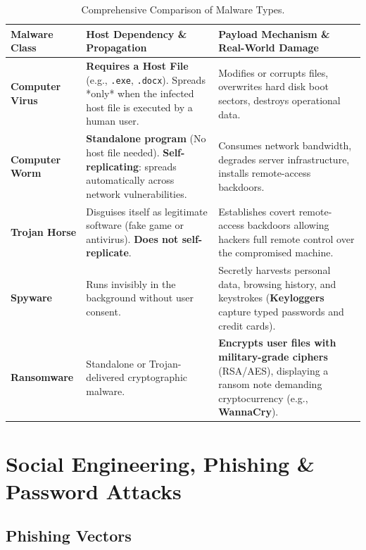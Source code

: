 \begin{table}[htbp]
\centering
\small
\renewcommand{\arraystretch}{1.3}
\begin{tabularx}{\linewidth}{l>{\raggedright\arraybackslash}p{2.8cm}>{\raggedright\arraybackslash}X}
\toprule
\textbf{Malware Class} & \textbf{Host Dependency \& Propagation} & \textbf{Payload Mechanism \& Real-World Damage} \\
\midrule
\textbf{Computer Virus} & \textbf{Requires a Host File} (e.g., \texttt{.exe}, \texttt{.docx}). Spreads *only* when the infected host file is executed by a human user. & Modifies or corrupts files, overwrites hard disk boot sectors, destroys operational data. \\
\textbf{Computer Worm} & \textbf{Standalone program} (No host file needed). \textbf{Self-replicating}: spreads automatically across network vulnerabilities. & Consumes network bandwidth, degrades server infrastructure, installs remote-access backdoors. \\
\textbf{Trojan Horse} & Disguises itself as legitimate software (fake game or antivirus). \textbf{Does not self-replicate}. & Establishes covert remote-access backdoors allowing hackers full remote control over the compromised machine. \\
\textbf{Spyware} & Runs invisibly in the background without user consent. & Secretly harvests personal data, browsing history, and keystrokes (\textbf{Keyloggers} capture typed passwords and credit cards). \\
\textbf{Ransomware} & Standalone or Trojan-delivered cryptographic malware. & \textbf{Encrypts user files with military-grade ciphers} (RSA/AES), displaying a ransom note demanding cryptocurrency (e.g., \textbf{WannaCry}). \\
\bottomrule
\end{tabularx}
\caption{Comprehensive Comparison of Malware Types.}
\label{tab:malware-taxonomy-master}
\end{table}

\section{Social Engineering, Phishing \& Password Attacks}

\subsection{Phishing Vectors}


